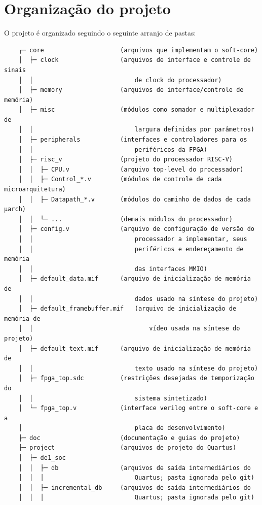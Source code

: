 \section{Organização do projeto}
    { O projeto é organizado seguindo o seguinte arranjo de pastas:
    }
\begin{verbatim}
    ┌─ core                     (arquivos que implementam o soft-core)
    │  ├─ clock                 (arquivos de interface e controle de sinais
    │  │                            de clock do processador)
    │  ├─ memory                (arquivos de interface/controle de memória)
    │  ├─ misc                  (módulos como somador e multiplexador de
    │  │                            largura definidas por parâmetros)
    │  ├─ peripherals           (interfaces e controladores para os
    │  │                            periféricos da FPGA)
    │  ├─ risc_v                (projeto do processador RISC-V)
    │  │  ├─ CPU.v              (arquivo top-level do processador)
    │  │  ├─ Control_*.v        (módulos de controle de cada microarquitetura)
    │  │  ├─ Datapath_*.v       (módulos do caminho de dados de cada µarch)
    │  │  └─ ...                (demais módulos do processador)
    │  ├─ config.v              (arquivo de configuração de versão do
    │  │                            processador a implementar, seus
    │  │                            periféricos e endereçamento de memória
    │  │                            das interfaces MMIO)
    │  ├─ default_data.mif      (arquivo de inicialização de memória de
    │  │                            dados usado na síntese do projeto)
    │  ├─ default_framebuffer.mif   (arquivo de inicialização de memória de
    │  │                                vídeo usada na síntese do projeto)
    │  ├─ default_text.mif      (arquivo de inicialização de memória de
    │  │                            texto usado na síntese do projeto)
    │  ├─ fpga_top.sdc          (restrições desejadas de temporização do
    │  │                            sistema sintetizado)
    │  └─ fpga_top.v            (interface verilog entre o soft-core e a
    │                               placa de desenvolvimento)
    ├─ doc                      (documentação e guias do projeto)
    ├─ project                  (arquivos de projeto do Quartus)
    │  ├─ de1_soc
    │  │  ├─ db                 (arquivos de saída intermediários do
    │  │  │                         Quartus; pasta ignorada pelo git)
    │  │  ├─ incremental_db     (arquivos de saída intermediários do
    │  │  │                         Quartus; pasta ignorada pelo git)

\end{verbatim}

